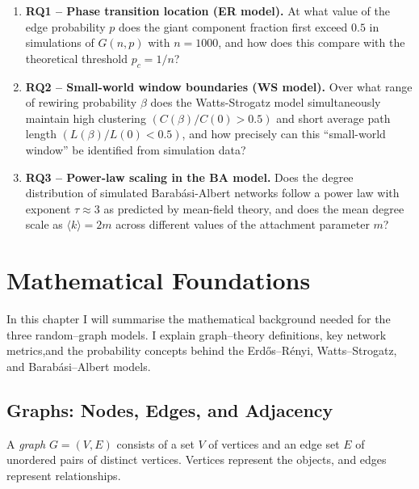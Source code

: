 \documentclass[12pt, a4paper]{report}
\theoremstyle{definition}
\theoremstyle{plain}
\theoremstyle{remark}
\begin{document}
\begin{enumerate}
    \item \textbf{RQ1 -- Phase transition location (ER model).} At 
    what value of the edge probability $p$ does the giant component 
    fraction first exceed $0.5$ in simulations of $G(n, p)$ with 
    $n = 1000$, and how does this compare with the theoretical threshold 
    $p_c = 1/n$?

    \item \textbf{RQ2 -- Small-world window boundaries (WS model).} 
    Over what range of rewiring probability $\beta$ does the 
    Watts-Strogatz model simultaneously maintain high clustering 
    $(C(\beta)/C(0) > 0.5)$ and short average path length 
    $(L(\beta)/L(0) < 0.5)$, and how precisely can this 
    ``small-world window'' be identified from simulation data?

    \item \textbf{RQ3 -- Power-law scaling in the BA model.} Does the 
    degree distribution of simulated Barab\'asi-Albert networks follow 
    a power law with exponent $\tau \approx 3$ as predicted by 
    mean-field theory, and does the mean degree scale as 
    $\langle k \rangle = 2m$ across different values of the attachment 
    parameter $m$?
\end{enumerate}

\chapter{Mathematical Foundations}
\label{chap:foundations}

In this chapter I will summarise the mathematical background needed
for the three random--graph models. I explain graph--theory definitions,
key network metrics,and the probability concepts behind the 
Erd\H{o}s--R\'enyi, Watts--Strogatz, and Barab\'{a}si--Albert models.

\section{Graphs: Nodes, Edges, and Adjacency}
\label{sec:graph_basics}

A \emph{graph} $G=(V,E)$ consists of a set $V$ of vertices and an edge set $E$
of unordered pairs of distinct vertices. Vertices represent the objects,
and edges represent relationships.
\end{document}
